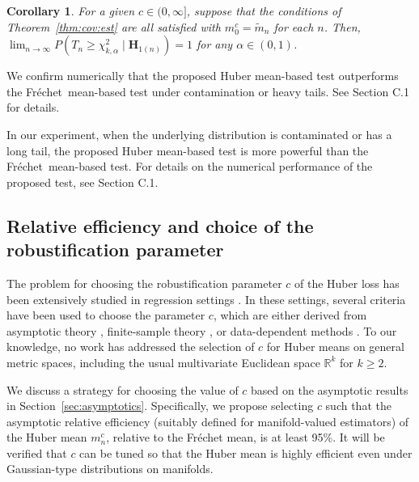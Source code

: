 \documentclass[preprint]{imsart}
\newcommand{\bbR}{\mathbb{R}}
\def\Frechet{Fr\'{e}chet}
\theoremstyle{plain}
\newtheorem{corollary}{Corollary}
\theoremstyle{remark}
\begin{document}
\begin{corollary}\label{cor:stat:power}
For a given $c \in (0,\infty]$, suppose that the conditions of Theorem~\ref{thm:cov:est} are all satisfied with $m_0^c = \tilde{m}_n$ for each $n$. Then, $\lim_{n\to \infty} P(T_{n} \ge \chi^{2}_{k, \alpha} \mid \textbf{H}_{1(n)}) = 1$ for any $\alpha \in (0, 1)$. 
\end{corollary}

We confirm numerically that the proposed Huber mean-based test outperforms the \Frechet\ mean-based test under contamination or heavy tails. See Section C.1 for details.

In our experiment, when the underlying distribution is contaminated or has a long tail, the proposed Huber mean-based test is more powerful than the \Frechet\ mean-based test. For details on the numerical performance of the proposed test, see Section C.1.  


\subsection{Relative efficiency and choice of the robustification parameter}\label{sec:RE}
The problem for choosing the robustification parameter $c$ of the Huber loss has been extensively studied in regression settings \citep[cf.][]{holland1977robust, zhou2018new}. In these settings, 
several criteria have been used to choose the parameter $c$, which are either derived from asymptotic theory \citep{holland1977robust}, finite-sample theory \citep{zhou2018new}, or data-dependent methods \citep{jiang2019robust}. 
To our knowledge, no work has addressed the selection of $c$ for Huber means on general metric spaces, including the usual multivariate Euclidean space $\bbR^{k}$ for $k \ge 2$. 

We discuss a strategy for choosing the value of $c$ based on the asymptotic results in Section~\ref{sec:asymptotics}. Specifically, we propose selecting $c$ such that the asymptotic relative efficiency (suitably defined for manifold-valued estimators) of the Huber mean $m_n^c$, relative to the Fr\'{e}chet mean, is at least 95\%. It will be verified that $c$ can be tuned so that the Huber mean is highly efficient even under Gaussian-type distributions on manifolds. 
\end{document}
